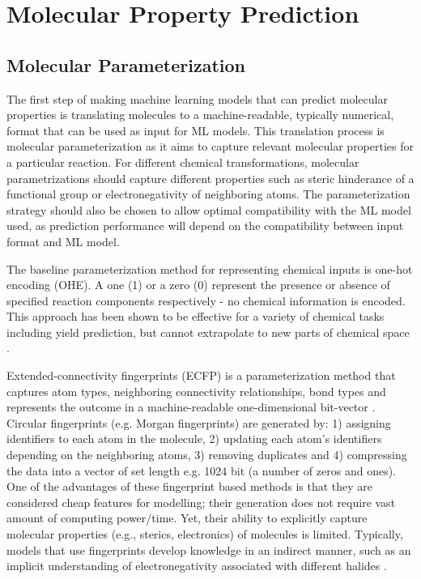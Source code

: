 \section{Molecular Property Prediction}

\subsection{Molecular Parameterization}

The first step of making machine learning models that can predict molecular properties is translating molecules to a machine-readable, typically numerical, format that can be used as input for ML models. This translation process is molecular parameterization as it aims to capture relevant molecular properties for a particular reaction. For different chemical transformations, molecular parametrizations should capture different properties such as steric hinderance of a functional group or electronegativity of neighboring atoms. The parameterization strategy should also be chosen to allow optimal compatibility with the ML model used, as prediction performance will depend on the compatibility between input format and ML model.

The baseline parameterization method for representing chemical inputs is one-hot encoding (OHE). A one (1) or a zero (0) represent the presence or absence of specified reaction components respectively - no chemical information is encoded. This approach has been shown to be effective for a variety of chemical tasks including yield prediction, but cannot extrapolate to new parts of chemical space \cite{Pomberger2023}. 

Extended-connectivity fingerprints (ECFP) is a parameterization method that captures atom types, neighboring connectivity relationships, bond types and represents the outcome in a machine-readable one-dimensional bit-vector \cite{Rogers2010}. Circular fingerprints (e.g. Morgan fingerprints) are generated by: 1) assigning identifiers to each atom in the molecule, 2) updating each atom’s identifiers depending on the neighboring atoms, 3) removing duplicates and 4) compressing the data into a vector of set length e.g. 1024 bit (a number of zeros and ones). One of the advantages of these fingerprint based methods is that they are considered cheap features for modelling; their generation does not require vast amount of computing power/time. Yet, their ability to explicitly capture molecular properties (e.g., sterics, electronics) of molecules is limited. Typically, models that use fingerprints develop knowledge in an indirect manner, such as an implicit understanding of electronegativity associated with different halides \cite{Eyke2020}.

